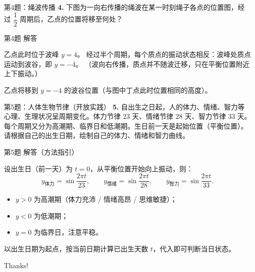 \documentclass[10pt,aspectratio=169,serif]{beamer}
\begin{document}
\begin{frame}[t]{第4题：绳波传播}
\textbf{4.} 下图为一向右传播的绳波在某一时刻绳子各点的位置图，经过 $\dfrac12$ 周期后，乙点的位置将移至何处？

\begin{center}
\end{center}
\end{frame}

\begin{frame}[t]{第4题 解答}
\begin{tcolorbox}[colback=orange!10,colframe=orange,title=\textbf{解}]
乙点此时位于波峰 $y=4$。
经过半个周期，每个质点的振动状态相反：波峰处质点运动到波谷，即 $y=-4$。
（波向右传播，质点并不随波迁移，只在平衡位置附近上下振动。）

\alert{乙点将移到 $y=-4$ 的波谷位置（与图中丁点此时位置相同的高度）}。
\end{tcolorbox}
\end{frame}

\begin{frame}[t]{第5题：人体生物节律（开放实践）}
\textbf{5.} 自出生之日起，人的体力、情绪、智力等心理、生理状况呈周期变化。体力节律 $23$ 天、情绪节律 $28$ 天、智力节律 $33$ 天。每个周期又分为高潮期、临界日和低潮期。生日前一天是起始位置（平衡位置）。请根据自己的出生日期，绘制自己的体力、情绪和智力曲线。
\end{frame}

\begin{frame}[t]{第5题 解答（方法指引）}
\begin{tcolorbox}[colback=orange!10,colframe=orange,title=\textbf{建模方法}]
设出生日（前一天）为 $t=0$，从平衡位置开始向上振动，则：
\[
y_{\text{体力}}=\sin\frac{2\pi t}{23},\qquad
y_{\text{情绪}}=\sin\frac{2\pi t}{28},\qquad
y_{\text{智力}}=\sin\frac{2\pi t}{33}.
\]
\begin{itemize}
  \item $y>0$ 为高潮期（体力充沛 / 情绪高昂 / 思维敏捷）；
  \item $y<0$ 为低潮期；
  \item $y=0$ 为临界日，注意平稳。
\end{itemize}
以出生日期为起点，按当前日期计算已出生天数 $t$，代入即可判断当日状态。
\end{tcolorbox}
\end{frame}

\begin{frame}[c]
  \begin{center}
    {\Huge\calligra Thanks!}
  \end{center}
\end{frame}
\end{document}
